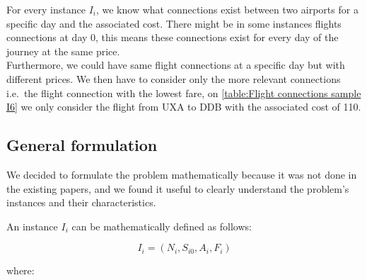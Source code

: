 For every instance $I_i$, we know what connections exist between two airports for a specific day and the associated cost.
There might be in some instances flights connections at day 0, this means these connections exist for every day of the journey at the same price.
\\Furthermore, we could have same flight connections at a specific day but with different prices. We then have to consider only the more relevant connections i.e.\ the flight connection with the lowest fare, on \ref{table:Flight connections sample I6} we only consider the flight from UXA to DDB with the associated cost of 110.

\subsection{General formulation}
We decided to formulate the problem mathematically because it was not done in the existing papers, and we found it useful to clearly understand the problem's instances and their characteristics.


An instance \(I_i\) can be mathematically defined as follows:

\[
    I_i = (N_i, S_{i0}, A_{i}, F_{i})
\]

where:


